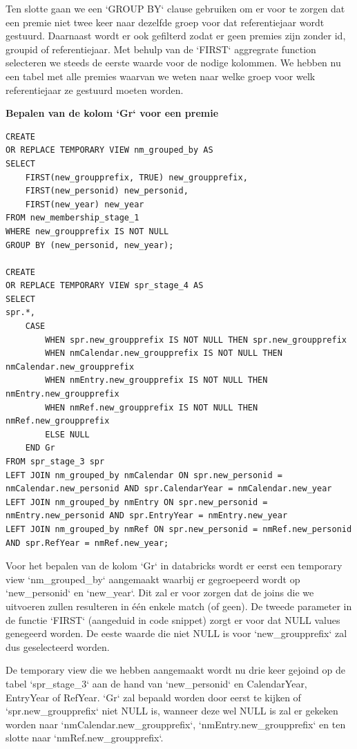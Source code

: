 Ten slotte gaan we een `GROUP BY` clause gebruiken om er voor te zorgen dat een premie niet twee keer naar dezelfde groep voor dat referentiejaar wordt gestuurd. Daarnaast wordt er ook gefilterd zodat er geen premies zijn zonder id, groupid of referentiejaar. Met behulp van de `FIRST` aggregrate function selecteren we steeds de eerste waarde voor de nodige kolommen. We hebben nu een tabel met alle premies waarvan we weten naar welke groep voor welk referentiejaar ze gestuurd moeten worden.

\textbf{Bepalen van de kolom `Gr` voor een premie}

\begin{verbatim}
CREATE
OR REPLACE TEMPORARY VIEW nm_grouped_by AS
SELECT 
    FIRST(new_groupprefix, TRUE) new_groupprefix, 
    FIRST(new_personid) new_personid, 
    FIRST(new_year) new_year 
FROM new_membership_stage_1
WHERE new_groupprefix IS NOT NULL 
GROUP BY (new_personid, new_year);

CREATE 
OR REPLACE TEMPORARY VIEW spr_stage_4 AS 
SELECT
spr.*,
    CASE
        WHEN spr.new_groupprefix IS NOT NULL THEN spr.new_groupprefix
        WHEN nmCalendar.new_groupprefix IS NOT NULL THEN nmCalendar.new_groupprefix
        WHEN nmEntry.new_groupprefix IS NOT NULL THEN nmEntry.new_groupprefix
        WHEN nmRef.new_groupprefix IS NOT NULL THEN nmRef.new_groupprefix
        ELSE NULL
    END Gr
FROM spr_stage_3 spr
LEFT JOIN nm_grouped_by nmCalendar ON spr.new_personid = nmCalendar.new_personid AND spr.CalendarYear = nmCalendar.new_year
LEFT JOIN nm_grouped_by nmEntry ON spr.new_personid = nmEntry.new_personid AND spr.EntryYear = nmEntry.new_year
LEFT JOIN nm_grouped_by nmRef ON spr.new_personid = nmRef.new_personid AND spr.RefYear = nmRef.new_year;
\end{verbatim}

Voor het bepalen van de kolom `Gr` in databricks wordt er eerst een temporary view `nm\_grouped\_by` aangemaakt waarbij er gegroepeerd wordt op `new\_personid` en `new\_year`. Dit zal er voor zorgen dat de joins die we uitvoeren zullen resulteren in één enkele match (of geen). De tweede parameter in de functie `FIRST` (aangeduid in code snippet) zorgt er voor dat NULL values genegeerd worden. De eeste waarde die niet NULL is voor `new\_groupprefix` zal dus geselecteerd worden.

De temporary view die we hebben aangemaakt wordt nu drie keer gejoind op de tabel `spr\_stage\_3` aan de hand van `new\_personid` en CalendarYear, EntryYear of RefYear. `Gr` zal bepaald worden door eerst te kijken of `spr.new\_groupprefix` niet NULL is, wanneer deze wel NULL is zal er gekeken worden naar `nmCalendar.new\_groupprefix`, `nmEntry.new\_groupprefix` en ten slotte naar `nmRef.new\_groupprefix`.


